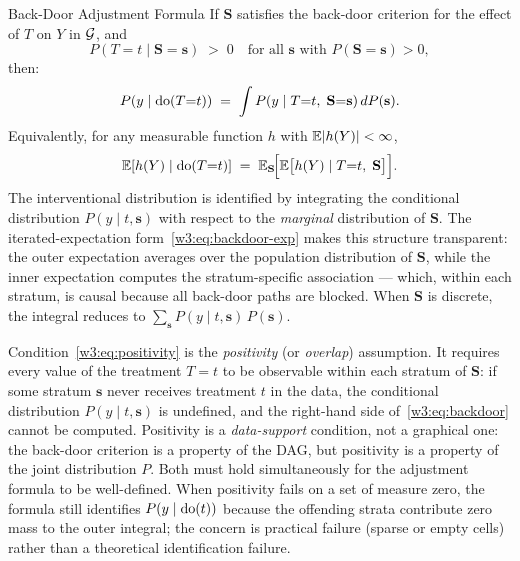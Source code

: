 \documentclass[master.tex]{subfiles}
\begin{document}
\begin{thm}{Back-Door Adjustment Formula \citep{pearl1993comment}}
\label{w3:thm:backdoor}
If $\mathbf{S}$ satisfies the back-door criterion for the effect of $T$ on
$Y$ in $\mathcal{G}$, and
\begin{equation}
  P(T{=}t \mid \mathbf{S}{=}\mathbf{s}) \;>\; 0
  \quad \text{for all } \mathbf{s} \text{ with } P(\mathbf{S}{=}\mathbf{s}) > 0,
  \label{w3:eq:positivity}
\end{equation}
then:
\begin{equation}
  P\!\left(y \mid \mathrm{do}(T{=}t)\right)
  \;=\; \int P(y \mid T{=}t,\;\mathbf{S}{=}\mathbf{s})\,dP(\mathbf{s}).
  \label{w3:eq:backdoor}
\end{equation}
Equivalently, for any measurable function $h$ with $\mathbb{E}|h(Y)| < \infty$,
\begin{equation}
  \mathbb{E}\!\left[h(Y) \mid \mathrm{do}(T{=}t)\right]
  \;=\; \mathbb{E}_{\mathbf{S}}\!\Bigl[\mathbb{E}\bigl[h(Y) \mid T{=}t,\;\mathbf{S}\bigr]\Bigr].
  \label{w3:eq:backdoor-exp}
\end{equation}
The interventional distribution is identified by integrating the
conditional distribution $P(y \mid t, \mathbf{s})$ with respect to the
\emph{marginal} distribution of $\mathbf{S}$.  The iterated-expectation
form~\eqref{w3:eq:backdoor-exp} makes this structure transparent: the
outer expectation averages over the population distribution of $\mathbf{S}$,
while the inner expectation computes the stratum-specific association --- which,
within each stratum, is causal because all back-door paths are blocked.
When $\mathbf{S}$ is discrete, the integral reduces to
$\sum_{\mathbf{s}} P(y \mid t, \mathbf{s})\,P(\mathbf{s})$.
\end{thm}

\begin{remark}
Condition~\eqref{w3:eq:positivity} is the \emph{positivity} (or
\emph{overlap}) assumption.  It requires every value of the treatment
$T{=}t$ to be observable within each stratum of $\mathbf{S}$: if some
stratum $\mathbf{s}$ never receives treatment $t$ in the data, the
conditional distribution $P(y \mid t, \mathbf{s})$ is undefined, and the
right-hand side of~\eqref{w3:eq:backdoor} cannot be computed.
Positivity is a \emph{data-support} condition, not a graphical one: the
back-door criterion is a property of the DAG, but positivity is a property
of the joint distribution $P$.  Both must hold simultaneously for the
adjustment formula to be well-defined.  When positivity fails on a set of
measure zero, the formula still identifies $P(y \mid \mathrm{do}(t))$ because
the offending strata contribute zero mass to the outer integral; the
concern is practical failure (sparse or empty cells) rather than a
theoretical identification failure.
\end{remark}
\end{document}
